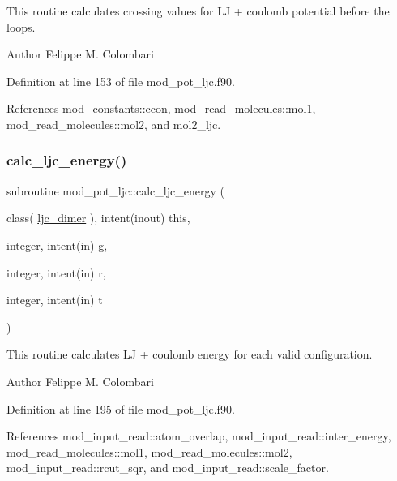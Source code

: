 This routine calculates crossing values for LJ + coulomb potential before the loops. 

\begin{DoxyAuthor}{Author}
Felippe M. Colombari 
\end{DoxyAuthor}


Definition at line 153 of file mod\+\_\+pot\+\_\+ljc.\+f90.



References mod\+\_\+constants\+::ccon, mod\+\_\+read\+\_\+molecules\+::mol1, mod\+\_\+read\+\_\+molecules\+::mol2, and mol2\+\_\+ljc.

\mbox{\label{namespacemod__pot__ljc_ab48e8b4489ee4bd72910cbed5e760a42}} 
\subsubsection{\texorpdfstring{calc\+\_\+ljc\+\_\+energy()}{calc\_ljc\_energy()}}
{\footnotesize\ttfamily subroutine mod\+\_\+pot\+\_\+ljc\+::calc\+\_\+ljc\+\_\+energy (\begin{DoxyParamCaption}\item[{class( \hyperlink{structmod__pot__ljc_1_1ljc__dimer}{ljc\+\_\+dimer} ), intent(inout)}]{this,  }\item[{integer, intent(in)}]{g,  }\item[{integer, intent(in)}]{r,  }\item[{integer, intent(in)}]{t }\end{DoxyParamCaption})}



This routine calculates LJ + coulomb energy for each valid configuration. 

\begin{DoxyAuthor}{Author}
Felippe M. Colombari 
\end{DoxyAuthor}


Definition at line 195 of file mod\+\_\+pot\+\_\+ljc.\+f90.



References mod\+\_\+input\+\_\+read\+::atom\+\_\+overlap, mod\+\_\+input\+\_\+read\+::inter\+\_\+energy, mod\+\_\+read\+\_\+molecules\+::mol1, mod\+\_\+read\+\_\+molecules\+::mol2, mod\+\_\+input\+\_\+read\+::rcut\+\_\+sqr, and mod\+\_\+input\+\_\+read\+::scale\+\_\+factor.

